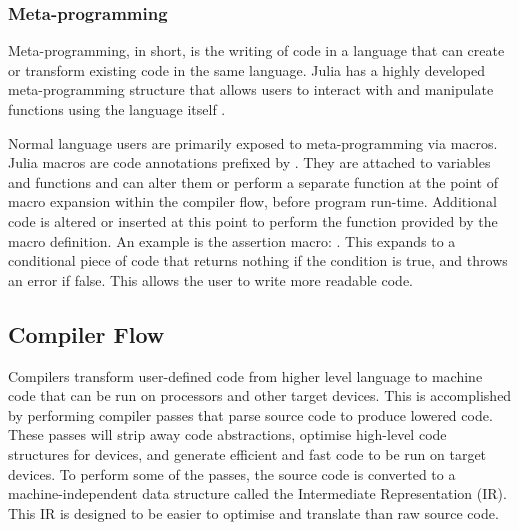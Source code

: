 \subsubsection{Meta-programming}
Meta-programming, in short, is the writing of code in a language that can create or transform existing code in the same language. Julia has a highly developed meta-programming structure that allows users to interact with and manipulate functions using the language itself \cite{julia_meta}.

Normal language users are primarily exposed to meta-programming via macros. Julia macros are code annotations prefixed by . They are attached to variables and functions and can alter them or perform a separate function at the point of macro expansion within the compiler flow, before program run-time. Additional code is altered or inserted at this point to perform the function provided by the macro definition. An example is the assertion macro: . This expands to a conditional piece of code that returns nothing if the condition is true, and throws an error if false. This allows the user to write more readable code. 

\pagebreak 

\subsection{Compiler Flow}
\label{sec:compiler_flow}

Compilers transform user-defined code from higher level language to machine code that can be run on processors and other target devices. This is accomplished by performing compiler passes that parse source code to produce lowered code. These passes will strip away code abstractions, optimise high-level code structures for devices, and generate efficient and fast code to be run on target devices. To perform some of the passes, the source code is converted to a machine-independent data structure called the Intermediate Representation (IR). This IR is designed to be easier to optimise and translate than raw source code. 

